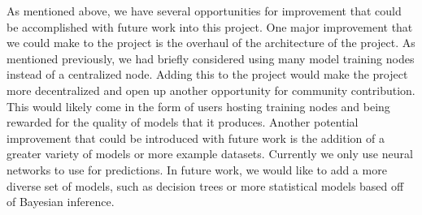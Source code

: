 \documentclass{article}
\begin{document}
    As mentioned above, we have several opportunities for improvement that could be accomplished with future work
    into this project.  One major improvement that we could make to the project is the overhaul of the architecture of
    the project.  As mentioned previously, we had briefly considered using many model training nodes instead of a
    centralized node.  Adding this to the project would make the project more decentralized and open up another opportunity
    for community contribution.  This would likely come in the form of users hosting training nodes and being rewarded for
    the quality of models that it produces.  Another potential improvement that could be introduced with future work is
    the addition of a greater variety of models or more example datasets.  Currently we only use neural networks to
    use for predictions.  In future work, we would like to add a more diverse set of models, such as decision trees or
    more statistical models based off of Bayesian inference.

    \pagebreak
    
    
\end{document}
